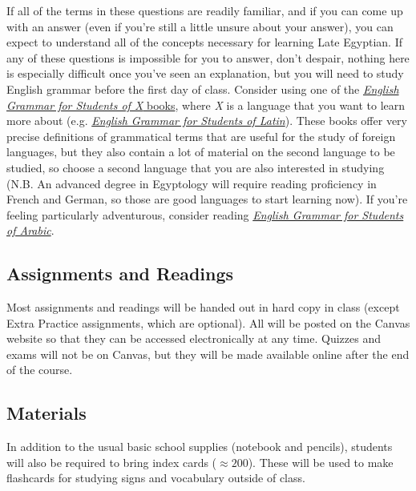 \documentclass[11pt]{article}
\begin{document}
		If all of the terms in these questions are readily familiar, and if you can come up with an answer (even if you're still a little unsure about your answer), you can  expect to understand all of the concepts necessary for learning Late Egyptian.
		If any of these questions is impossible for you to answer, 
			don't despair, nothing here is especially difficult once you've seen an explanation, 
			but you will need to study English grammar before the first day of class.
		Consider using one of the \href{https://www.amazon.com/s/ref=nb_sb_noss_2?url=search-alias\%3Dstripbooks&field-keywords=english+grammar+for+students}{\emph{English Grammar for Students of X} books}, where \emph{X} is a language that you want to learn more about
			(e.g. \href{https://www.amazon.com/English-Grammar-Students-Latin-Learning/dp/0934034346/ref=sr_1_1?s=books&ie=UTF8&qid=1490732513&sr=1-1&keywords=english+grammar+for+students+of+latin}{\emph{English Grammar for Students of Latin}}).
		These books offer very precise definitions of grammatical terms that are useful for the study of foreign languages, 
			but they also contain a lot of material on the second language to be studied,
			so choose a second language that you are also interested in studying
			(N.B. An advanced degree in Egyptology will require reading proficiency in French and German, so those are good languages to start learning now).
			If you're feeling particularly adventurous, consider reading \href{https://www.amazon.com/English-Grammar-Students-Arabic-Learning/dp/0934034354}{\emph{English Grammar for Students of Arabic}}.
			
	\subsection*{Assignments and Readings}
		Most assignments and readings will be handed out in hard copy in class
			(except Extra Practice assignments, which are optional).
		All will be posted on the Canvas website so that they can be accessed electronically at any time.
		Quizzes and exams will not be on Canvas, but they will be made available online after the end of the course.
	
	\subsection*{Materials}
		In addition to the usual basic school supplies (notebook and pencils), students will also be required to bring index cards ($\approx 200$).
		These will be used to make flashcards for studying signs and vocabulary outside of class.
		
\end{document}
